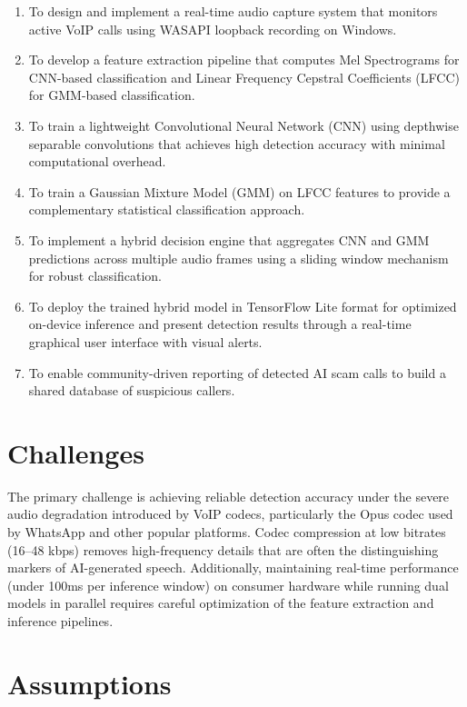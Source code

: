 \documentclass[12pt,a4paper,titlepage]{report}
\begin{document}
	\begin{enumerate}
		\item To design and implement a real-time audio capture system that monitors active VoIP calls using WASAPI loopback recording on Windows.
		\item To develop a feature extraction pipeline that computes Mel Spectrograms for CNN-based classification and Linear Frequency Cepstral Coefficients (LFCC) for GMM-based classification.
		\item To train a lightweight Convolutional Neural Network (CNN) using depthwise separable convolutions that achieves high detection accuracy with minimal computational overhead.
		\item To train a Gaussian Mixture Model (GMM) on LFCC features to provide a complementary statistical classification approach.
		\item To implement a hybrid decision engine that aggregates CNN and GMM predictions across multiple audio frames using a sliding window mechanism for robust classification.
		\item To deploy the trained hybrid model in TensorFlow Lite format for optimized on-device inference and present detection results through a real-time graphical user interface with visual alerts.
        \item To enable community-driven reporting of detected AI scam calls to build a shared database of suspicious callers.
	\end{enumerate}
	
	\section{Challenges}
	
	The primary challenge is achieving reliable detection accuracy under the severe audio degradation introduced by VoIP codecs, particularly the Opus codec used by WhatsApp and other popular platforms. Codec compression at low bitrates (16--48 kbps) removes high-frequency details that are often the distinguishing markers of AI-generated speech. Additionally, maintaining real-time performance (under 100ms per inference window) on consumer hardware while running dual models in parallel requires careful optimization of the feature extraction and inference pipelines.
	
	
	\section{Assumptions}
	
\end{document}
